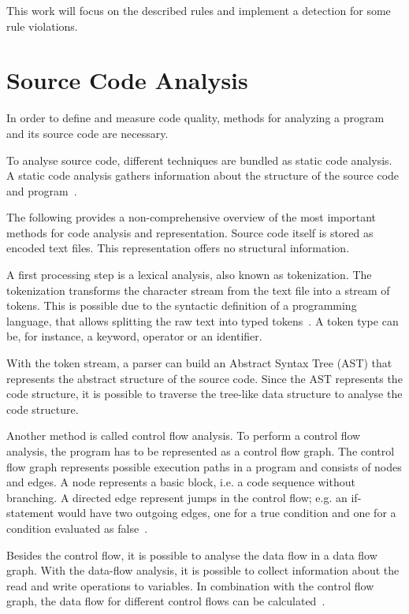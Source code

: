 This work will focus on the described rules and implement a detection for some rule violations.

\section{Source Code Analysis}\label{sec:code_analysis}
In order to define and measure code quality, methods for analyzing a program and its source code are necessary.

To analyse source code, different techniques are bundled as static code analysis. A static code analysis gathers information about the structure of the source code and program~\cite{prahofer_static_2017}.

The following provides a non-comprehensive overview of the most important methods for code analysis and representation.
Source code itself is stored as encoded text files. This representation offers no structural information. 

A first processing step is a lexical analysis, also known as tokenization. The tokenization transforms the character stream from the text file into a stream of tokens. This is possible due to the syntactic definition of a programming language, that allows splitting the raw text into typed tokens~\cite{mogensen_introduction_2017}. A token type can be, for instance, a keyword, operator or an identifier.

With the token stream, a parser can build an Abstract Syntax Tree (AST) that represents the abstract structure of the source code.
Since the AST represents the code structure, it is possible to traverse the tree-like data structure to analyse the code structure.

Another method is called control flow analysis. To perform a control flow analysis, the program has to be represented as a control flow graph. The control flow graph represents possible execution paths in a program and consists of nodes and edges. A node represents a basic block, i.e. a code sequence without branching. A directed edge represent jumps in the control flow; e.g. an if-statement would have two outgoing edges, one for a true condition and one for a condition evaluated as false~\cite{allen_control_1970}.

Besides the control flow, it is possible to analyse the data flow in a data flow graph. With the data-flow analysis, it is possible to collect information about the read and write operations to variables. In combination with the control flow graph, the data flow for different control flows can be calculated~\cite{mogensen_introduction_2017}.

